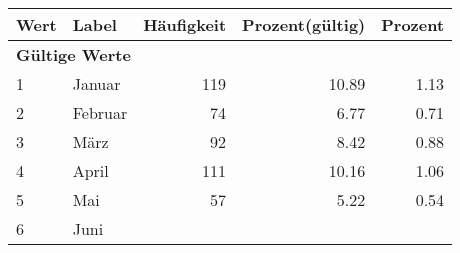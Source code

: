      \begin{longtable}{lXrrr}
     \toprule
     \textbf{Wert} & \textbf{Label} & \textbf{Häufigkeit} & \textbf{Prozent(gültig)} & \textbf{Prozent} \\
     \endhead
     \midrule
     \multicolumn{5}{l}{\textbf{Gültige Werte}}\\

     1 &
     \multicolumn{1}{X}{ Januar   } &


       \num{119} &
       \num[round-mode=places,round-precision=2]{10,89} &
         \num[round-mode=places,round-precision=2]{1,13} \\

     2 &
     \multicolumn{1}{X}{ Februar   } &


       \num{74} &
       \num[round-mode=places,round-precision=2]{6,77} &
         \num[round-mode=places,round-precision=2]{0,71} \\

     3 &
     \multicolumn{1}{X}{ März   } &


       \num{92} &
       \num[round-mode=places,round-precision=2]{8,42} &
         \num[round-mode=places,round-precision=2]{0,88} \\

     4 &
     \multicolumn{1}{X}{ April   } &


       \num{111} &
       \num[round-mode=places,round-precision=2]{10,16} &
         \num[round-mode=places,round-precision=2]{1,06} \\

     5 &
     \multicolumn{1}{X}{ Mai   } &


       \num{57} &
       \num[round-mode=places,round-precision=2]{5,22} &
         \num[round-mode=places,round-precision=2]{0,54} \\

     6 &
     \multicolumn{1}{X}{ Juni   } &



\end{longtable}
